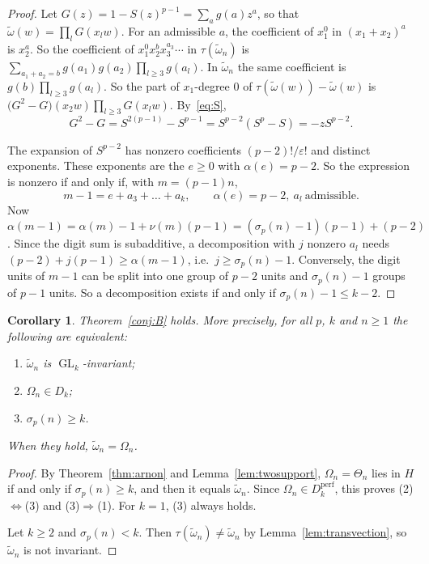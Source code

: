 \documentclass[11pt]{amsart}
\newtheorem{corollary}[theorem]{Corollary}
\theoremstyle{definition}
\theoremstyle{remark}
\newcommand{\Dk}{D_k}
\newcommand{\Dperf}{D_k^{\mathrm{perf}}}
\newcommand{\wt}{\widetilde{\omega}}
\DeclareMathOperator{\GL}{GL}
\begin{document}
\begin{proof}
Let $G(z)=1-S(z)^{p-1}=\sum_ag(a)z^a$, so that
$\wt(w)=\prod_lG(x_lw)$.  For an admissible $a$, the coefficient of $x_1^0$ in
$(x_1+x_2)^a$ is $x_2^a$.  So the coefficient of $x_1^0x_2^bx_3^{a_3}\cdots$ in
$\tau(\wt_n)$ is $\sum_{a_1+a_2=b}g(a_1)g(a_2)\prod_{l\ge3}g(a_l)$.  In $\wt_n$
the same coefficient is $g(b)\prod_{l\ge3}g(a_l)$.  So the part of
$x_1$-degree $0$ of $\tau(\wt(w))-\wt(w)$ is
$\bigl(G^2-G\bigr)(x_2w)\prod_{l\ge3}G(x_lw)$.  By~\eqref{eq:S},
\[
  G^2-G=S^{2(p-1)}-S^{p-1}=S^{p-2}(S^p-S)=-zS^{p-2}.
\]

The expansion of $S^{p-2}$ has nonzero coefficients $(p-2)!/\varepsilon!$ and
distinct exponents.  These exponents are the $e\ge0$ with $\alpha(e)=p-2$.  So
the expression is nonzero if and only if, with $m=(p-1)n$,
\[
  m-1=e+a_3+\dots+a_k,\qquad \alpha(e)=p-2,\ a_l\ \text{admissible}.
\]
Now $\alpha(m-1)=\alpha(m)-1+\nu(m)(p-1)=(\sigma_p(n)-1)(p-1)+(p-2)$.  Since
the digit sum is subadditive, a decomposition with $j$ nonzero $a_l$ needs
$(p-2)+j(p-1)\ge\alpha(m-1)$, i.e.\ $j\ge\sigma_p(n)-1$.  Conversely, the
digit units of $m-1$ can be split into one group of $p-2$ units and
$\sigma_p(n)-1$ groups of $p-1$ units.  So a decomposition exists if and only if
$\sigma_p(n)-1\le k-2$.
\end{proof}

\begin{corollary}\label{cor:conjB2}
Theorem~\ref{conj:B} holds.  More precisely, for all $p$, $k$ and $n\ge1$ the
following are equivalent:
\begin{enumerate}
\item $\wt_n$ is $\GL_k$-invariant;
\item $\Omega_n\in\Dk$;
\item $\sigma_p(n)\ge k$.
\end{enumerate}
When they hold, $\wt_n=\Omega_n$.
\end{corollary}

\begin{proof}
By Theorem~\ref{thm:arnon} and Lemma~\ref{lem:twosupport}, $\Omega_n=\Theta_n$
lies in $H$ if and only if $\sigma_p(n)\ge k$, and then it equals $\wt_n$.
Since $\Omega_n\in\Dperf$, this proves (2)$\Leftrightarrow$(3) and
(3)$\Rightarrow$(1).  For $k=1$, (3) always holds.

Let $k\ge2$ and $\sigma_p(n)<k$.  Then $\tau(\wt_n)\ne\wt_n$ by
Lemma~\ref{lem:transvection}, so $\wt_n$ is not invariant.
\end{proof}
\end{document}

